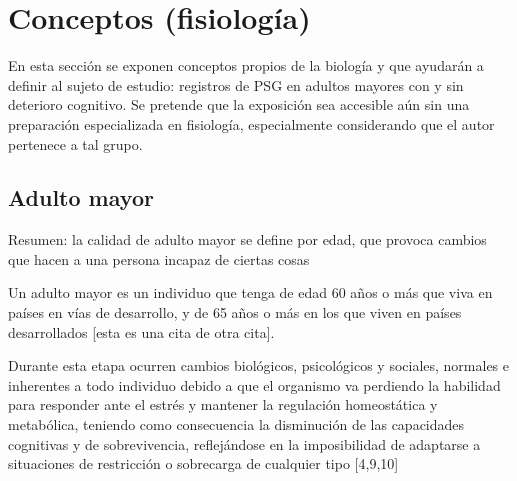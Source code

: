 \section{Conceptos (fisiolog\'ia)}

En esta secci\'on se exponen conceptos propios de la biolog\'ia y que ayudar\'an a definir
al sujeto de estudio: registros de PSG en adultos mayores con y sin deterioro cognitivo.
Se pretende que la exposici\'on sea accesible a\'un sin una preparaci\'on 
especializada en fisiolog\'ia, especialmente considerando que el autor pertenece a tal grupo.


\subsection{Adulto mayor}

Resumen: la calidad de adulto mayor se define por edad, que provoca cambios que hacen
a una persona incapaz de ciertas cosas

Un adulto mayor es un individuo que tenga de edad 
60 a\~nos o m\'as que viva en pa\'ises en v\'ias de desarrollo, y de 65 a\~nos o m\'as 
en los que viven en 
países desarrollados \cite{Hita14} [esta es una cita de otra cita].

Durante esta etapa ocurren cambios biol\'ogicos, psicol\'ogicos y sociales, normales e 
inherentes a todo individuo debido a que el organismo va perdiendo la habilidad para responder 
ante el estr\'es y mantener la regulación homeost\'atica y metabólica, teniendo como consecuencia 
la disminuci\'on de las capacidades cognitivas y de sobrevivencia, reflejándose en la imposibilidad 
de adaptarse a situaciones de restricci\'on o sobrecarga de cualquier tipo [4,9,10]

